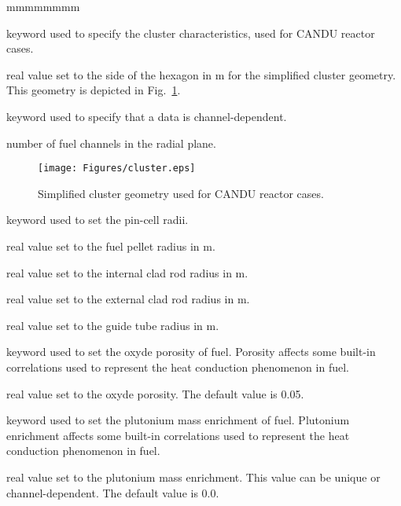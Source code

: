\begin{ListeDeDescription}{mmmmmmmm}
\item[\moc{CLUSTER}] keyword used to specify the cluster characteristics, used for CANDU reactor cases.

\item[\dusa{pitch}] real value set to the side of the hexagon in m for the simplified cluster geometry. This geometry is depicted in Fig.~\ref{fig:Cluster}.

\item[\moc{CHAN}] keyword used to specify that a data is channel-dependent.

\item[\dusa{nch}] number of fuel channels in the radial plane.

\begin{figure}[h!]
  \begin{center}
    \texttt{[image: Figures/cluster.eps]} 
\caption{Simplified cluster geometry used for CANDU reactor cases.}\label{fig:Cluster}
  \end{center}
\end{figure}

\item[\moc{RADIUS}] keyword used to set the pin-cell radii.

\item[\dusa{r1}] real value set to the fuel pellet radius in m.

\item[\dusa{r2}] real value set to the internal clad rod radius in m.

\item[\dusa{r3}] real value set to the external clad rod radius in m.

\item[\dusa{r4}] real value set to the guide tube radius in m.

\item[\moc{POROS}] keyword used to set the oxyde porosity of fuel. Porosity affects some built-in correlations
used to represent the heat conduction phenomenon in fuel.

\item[\dusa{poros}] real value set to the oxyde porosity. The default value is 0.05.

\item[\moc{PUFR}] keyword used to set the plutonium mass enrichment of fuel. Plutonium enrichment affects some built-in correlations
used to represent the heat conduction phenomenon in fuel.

\item[\dusa{pufr}] real value set to the plutonium mass enrichment. This value can be unique or channel-dependent. The default value is 0.0.


\end{ListeDeDescription}

